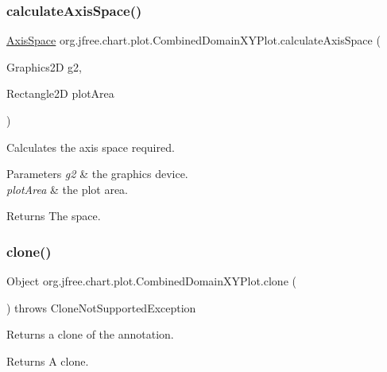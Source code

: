 \subsubsection{\texorpdfstring{calculate\+Axis\+Space()}{calculateAxisSpace()}}
{\footnotesize\ttfamily \mbox{\hyperlink{classorg_1_1jfree_1_1chart_1_1axis_1_1_axis_space}{Axis\+Space}} org.\+jfree.\+chart.\+plot.\+Combined\+Domain\+X\+Y\+Plot.\+calculate\+Axis\+Space (\begin{DoxyParamCaption}\item[{Graphics2D}]{g2,  }\item[{Rectangle2D}]{plot\+Area }\end{DoxyParamCaption})\hspace{0.3cm}{\ttfamily [protected]}}

Calculates the axis space required.


\begin{DoxyParams}{Parameters}
{\em g2} & the graphics device. \\
\hline
{\em plot\+Area} & the plot area.\\
\hline
\end{DoxyParams}
\begin{DoxyReturn}{Returns}
The space. 
\end{DoxyReturn}
\mbox{\label{classorg_1_1jfree_1_1chart_1_1plot_1_1_combined_domain_x_y_plot_a05f910d3f47a9b258e723b8a2ff08b8a}} 
\subsubsection{\texorpdfstring{clone()}{clone()}}
{\footnotesize\ttfamily Object org.\+jfree.\+chart.\+plot.\+Combined\+Domain\+X\+Y\+Plot.\+clone (\begin{DoxyParamCaption}{ }\end{DoxyParamCaption}) throws Clone\+Not\+Supported\+Exception}

Returns a clone of the annotation.

\begin{DoxyReturn}{Returns}
A clone.
\end{DoxyReturn}

